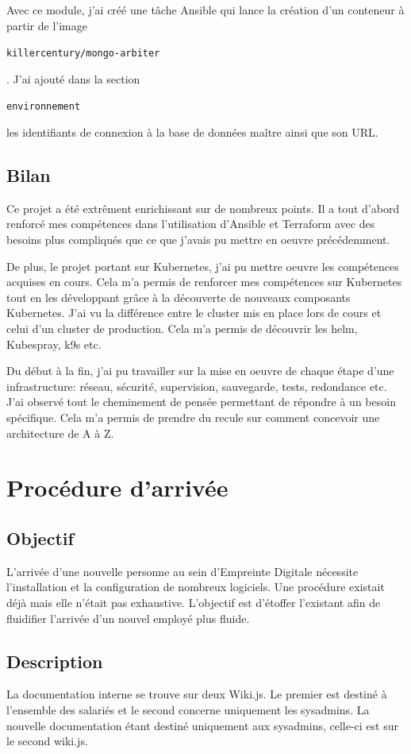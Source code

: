 \documentclass[12pt, a4paper, twoside]{article}
\begin{document}
Avec ce module, j'ai créé une tâche \gls{Ansible} qui lance la création d'un conteneur à partir de l'image \begin{code}\texttt{killercentury/mongo-arbiter}\end{code}.
J'ai ajouté dans la section \begin{code}\texttt{environnement}\end{code} les identifiants de connexion à la base de données maître ainsi que son URL.

\newpage
\subsection{Bilan}
Ce projet a été extrêment enrichissant sur de nombreux points.
Il a tout d'abord renforcé mes compétences dans l'utilisation d'\gls{Ansible} et \gls{Terraform} avec des besoins plus compliqués que ce que j'avais pu mettre en oeuvre précédemment.

De plus, le projet portant sur \gls{Kubernetes}, j'ai pu mettre oeuvre les compétences acquises en cours. 
Cela m'a permis de renforcer mes compétences sur \gls{Kubernetes} tout en les développant grâce à la découverte de nouveaux composants \gls{Kubernetes}.
J'ai vu la différence entre le \gls{cluster} mis en place lors de cours et celui d'un \gls{cluster} de production.
Cela m'a permis de découvrir les helm, \gls{Kubespray}, k9s etc.

Du début à la fin, j'ai pu travailler sur la mise en oeuvre de chaque étape d'une infrastructure: réseau, sécurité, supervision, sauvegarde, tests, redondance etc.
J'ai observé tout le cheminement de pensée permettant de répondre à un besoin spécifique.
Cela m'a permis de prendre du recule sur comment concevoir une architecture de A à Z.

\newpage
\section{Procédure d'arrivée}
\subsection{Objectif}
L'arrivée d'une nouvelle personne au sein d'Empreinte Digitale nécessite l'installation et la configuration de nombreux logiciels.
Une procédure existait déjà mais elle n'était pas exhaustive.
L'objectif est d'étoffer l'existant afin de fluidifier l'arrivée d'un nouvel employé plus fluide.

\subsection{Description}
La documentation interne se trouve sur deux Wiki.js.
Le premier est destiné à l'ensemble des salariés et le second concerne uniquement les sysadmins.
La nouvelle documentation étant destiné uniquement aux sysadmins, celle-ci est sur le second wiki.js.
\end{document}
